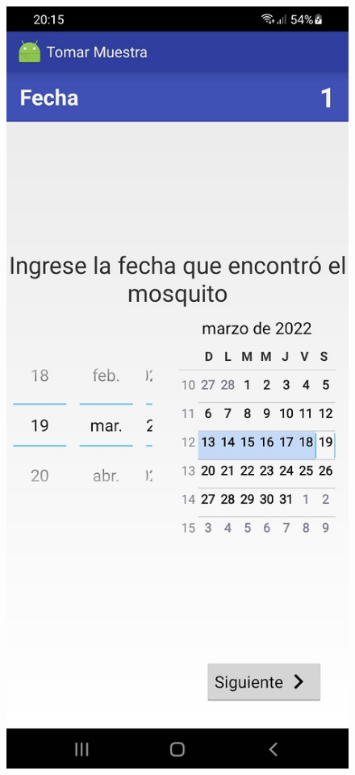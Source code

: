 \begin{figure}[H]
  \centering
    \includegraphics[scale=0.3]{50-anexos/C-steps/insert_date_screen.jpg} 

\end{figure}
